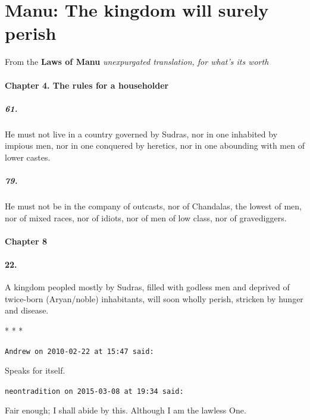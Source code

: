 \section{Manu: The kingdom will surely perish}

From the \textbf{Laws of Manu} \emph{unexpurgated translation, for what's its worth}

\paragraph{Chapter 4. The rules for a householder}

\subparagraph{61.}

He must not live in a country governed by Sudras, nor in one inhabited by impious men, nor in one conquered by heretics, nor in one abounding with men of lower castes.

\subparagraph{79.}

He must not be in the company of outcasts, nor of Chandalas, the lowest of men, nor of mixed races, nor of idiots, nor of men of low class, nor of gravediggers.

\paragraph{Chapter 8}

\paragraph{22.}

A kingdom peopled mostly by Sudras, filled with godless men and deprived of twice-born (Aryan/noble) inhabitants, will soon wholly perish, stricken by hunger and disease.


\begin{center}* * *\end{center}

\begin{footnotesize}
\begin{sffamily}
\texttt{Andrew on 2010-02-22 at 15:47 said:}

Speaks for itself.

\hfill

\texttt{neontradition on 2015-03-08 at 19:34 said:}

Fair enough; I shall abide by this. Although I am the lawless One.


\hfill

\end{sffamily}
\end{footnotesize}


